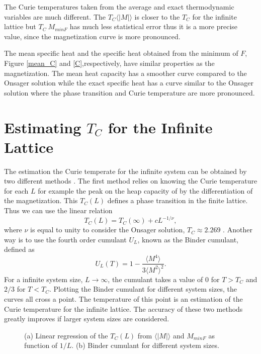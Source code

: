 	The Curie temperatures taken from the average and exact thermodynamic variables are much different. The $T_C \langle |M| \rangle$ is closer to the $T_C$ for the infinite lattice but $T_C\ M_{minF}$ has much less statistical error thus it is a more precise value, since the magnetization curve is more pronounced.
	
	The mean specific heat and the specific heat obtained from the minimum of $F$, Figure \ref{mean_C} and \ref{C},respectively, have similar properties as the magnetization. The mean heat capacity has a smoother curve compared to the Onsager solution while the exact specific heat has a curve similar to the Onsager solution where the phase transition and Curie temperature are more pronounced.

\pagebreak

\section{Estimating $T_C$ for the Infinite Lattice}

	The estimation the Curie temperate for the infinite system can be obtained by two different methods \cite{Landau_Book}. The first method relies on knowing the Curie temperature for each $L$ for example the peak on the heap capacity of by the differentiation of the magnetization. This $T_C(L)$ defines a phase transition in the finite lattice. Thus we can use the linear relation
\begin{equation}\label{TC_reg_exp}
	T_C(L) = T_C(\infty) + cL^{-1/\nu},
\end{equation}
where $\nu$ is equal to unity to consider the Onsager solution, $T_C\approx2.269$ \cite{Onsager1944}.
Another way is to use the fourth order cumulant $U_L$, known as the Binder cumulant, defined as
\begin{equation}
	U_L(T) = 1 - \frac{\langle M^4 \rangle}{3\langle M^2 \rangle^2}.
\end{equation}
For a infinite system size, $L\rightarrow\infty$, the cumulant takes a value of 0 for $T>T_C$ and $2/3$ for $T<T_C$.
Plotting the Binder cumulant for different system sizes, the curves all cross a point. The temperature of this point is an estimation of the Curie temperature for the infinite lattice. The accuracy of these two methods greatly improves if larger system sizes are considered.

\begin{figure}[h]
	\centering
	\caption{(a) Linear regression of the $T_C(L)$ from $\langle |M| \rangle$ and $M_{minF}$ as function of $1/L$. (b) Binder cumulant for different system sizes.}
	\label{TC_inf}
\end{figure}

